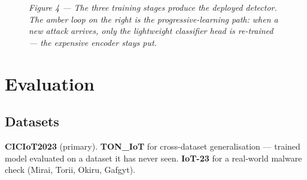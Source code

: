 \documentclass[11pt,a4paper]{article}
\begin{document}
\begin{figure}[H]
\caption*{\small\textit{Figure 4 --- The three training stages produce the deployed detector. The amber loop on the right is the progressive-learning path: when a new attack arrives, only the lightweight classifier head is re-trained --- the expensive encoder stays put.}}
\end{figure}

\section{Evaluation}

\subsection{Datasets}
\textbf{CICIoT2023} (primary). \textbf{TON\_IoT} for cross-dataset generalisation --- trained model evaluated on a dataset it has never seen. \textbf{IoT-23} for a real-world malware check (Mirai, Torii, Okiru, Gafgyt).
\end{document}
